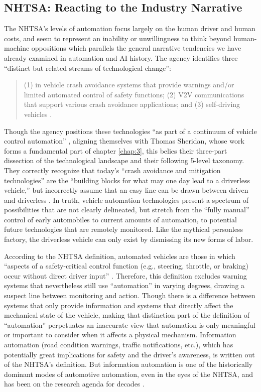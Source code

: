 \subsection{NHTSA: Reacting to the Industry Narrative}

The NHTSA's levels of automation focus largely on the human driver and
human costs, and seem to represent an inability or unwillingness to
think beyond human-machine oppositions which 
parallels the general narrative tendencies we have already examined in
automation and AI history. 
The agency identifies three ``distinct but related streams of
technological change'': 

\begin{quote}
(1) in vehicle crash avoidance systems that provide warnings and/or
limited automated control of safety functions; (2) V2V communications
that support various crash avoidance applications; and (3)
self-driving vehicles \cite[p. 3]{NHTSA}.
\end{quote}

Though the agency positions these technologies ``as part of a
continuum of vehicle control automation'' \cite[p. 3]{NHTSA}, aligning
themselves with Thomas Sheridan, whose
work forms a fundamental part of chapter \ref{chap:3}, this belies
their three-part dissection of the technological landscape and their
following 5-level taxonomy. They correctly recognize that today's
``crash avoidance and mitigation technologies'' are the ``building blocks
for what may one day lead to a driverless vehicle,'' but incorrectly
assume that an easy line can be drawn between driven and
driverless \cite[p. 3]{NHTSA}. In truth, vehicle automation
technologies present a spectrum of possibilities that are not clearly
delineated, but stretch from the ``fully manual'' control of early
automobiles to current amounts of automation, to potential future
technologies that are remotely monitored. Like the mythical personless
factory, the driverless vehicle can only exist by dismissing its new forms
of labor. 

According to the NHTSA definition, automated
vehicles are those in which ``aspects of a safety-critical control
function (e.g., steering, throttle, or braking) occur without direct
driver input'' \cite[p. 3]{NHTSA}. Therefore, this definition excludes warning
systems that nevertheless still use ``automation'' in varying degrees,
drawing a suspect line between monitoring and action. Though there is
a difference between systems that only provide information and systems
that directly affect the mechanical state of the vehicle, making that
distinction part of the definition of ``automation'' perpetuates an
inaccurate view that automation is only meaningful or important to
consider when it affects a physical mechanism. Information automation
(road condition warnings, traffic notifications, etc.), which has
potentially great implications for safety and the driver's awareness,
is written out of the NHTSA's definition. But information automation
is one of the historically dominant modes of automotive automation,
even in the eyes of the NHTSA, and has been on the research agenda for
decades \cite[p. 11]{wetmore}.

